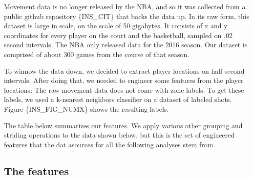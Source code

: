 \documentclass[]{article}
\begin{document}
Movement data is no longer released by the NBA, and so it was collected
from a public github repository \{INS\_CIT\} that backs the data up. In
its raw form, this dataset is large in scale, on the scale of 50
gigabytes. It consists of x and y coordinates for every player on the
court and the basketball, sampled on .02 second intervals. The NBA only
released data for the 2016 season. Our dataset is comprised of about 300
games from the course of that season.

To winnow the data down, we decided to extract player locations on half
second intervals. After doing that, we needed to engineer some features
from the player locations: The raw movement data does not come with zone
labels. To get these labels, we used a k-nearest neighbors classifier on
a dataset of labeled shots. Figure \{INS\_FIG\_NUMX\} shows the
resulting labels.

The table below summarizes our features. We apply various other grouping
and striding operations to the data shown below, but this is the set of
engineered features that the dat asources for all the following analyses
stem from.

\hypertarget{the-features}{%
\subsection{The features}\label{the-features}}
\end{document}
